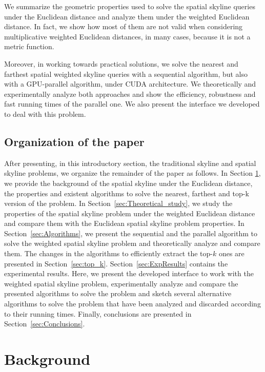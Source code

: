 \documentclass[11pt,onecolumn]{elsart3p}
\begin{document}
We summarize the geometric properties used to solve the spatial skyline queries under the Euclidean distance and analyze them under the weighted Euclidean distance. In fact, we show how most of them are not valid when considering multiplicative weighted Euclidean distances, in many cases, because it is not a metric function.

Moreover, in working towards practical solutions, we solve the nearest and farthest spatial weighted skyline queries with a sequential algorithm, but also with a GPU-parallel algorithm, under CUDA architecture. We theoretically and experimentally analyze both approaches and show the efficiency, robustness and fast running times of the parallel one. We also present the interface we developed to deal with this problem.

\subsection{Organization of the paper}

After presenting, in this introductory section, the traditional skyline and spatial skyline problems, we organize the remainder of the paper as follows. In Section \ref{sec:Background}, we provide the background of the spatial skyline under the Euclidean distance, the properties and existent algorithms to solve the nearest, farthest and top-k version of the problem.  In Section~\ref{sec:Theoretical_study}, we study the properties of the spatial skyline problem under the weighted Euclidean distance and compare them with the Euclidean spatial skyline problem properties. In Section~\ref{sec:Algorithms}, we present the sequential and the parallel algorithm to solve the weighted spatial skyline problem and theoretically analyze and compare them. The changes in the algorithms to efficiently extract the top-$k$ ones are presented in Section~\ref{sec:top_k}. Section~\ref{sec:ExpResults} contains the experimental results. Here, we present the developed interface to work with the weighted spatial skyline problem, experimentally analyze and compare the presented algorithms to solve the problem and sketch several alternative algorithms to solve the problem that have been analyzed and discarded according to their running times. Finally, conclusions are presented in Section~\ref{sec:Conclusions}.

\section{Background} \label{sec:Background}
\end{document}
